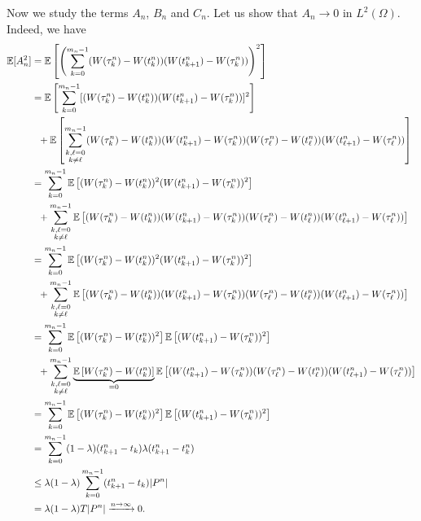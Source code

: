 \begin{solution}
  Now we study the terms $A_n$, $B_n$ and $C_n$. Let us show that $A_n\to 0$ in $L^2(\Omega)$. Indeed, we have
  \begin{align*}
    \mathbb{E}[A_n^2]
     & = \mathbb{E}\left[\left(\sum\limits_{k=0}^{m_n-1}(W(\tau_k^n) - W(t_k^n))(W(t^n_{k+1}) - W(\tau_k^n))\right)^2\right]        \\
     & = \mathbb{E}\left[\sum\limits_{k=0}^{m_n-1}[(W(\tau_k^n) - W(t_k^n))(W(t^n_{k+1}) - W(\tau_k^n))]^2\right]                   \\
     & \,\,\,\, + \mathbb{E}\left[\sum\limits_{\substack{k,\ell=0                                                                   \\ k\ne \ell}}^{m_n-1}(W(\tau_k^n) - W(t_k^n))(W(t^n_{k+1}) - W(\tau_k^n))(W(\tau_\ell^n) - W(t_\ell^n))(W(t^n_{\ell+1}) - W(\tau_\ell^n))\right]\\
     & = \sum\limits_{k=0}^{m_n-1}\mathbb{E}\left[(W(\tau_k^n) - W(t_k^n))^2(W(t^n_{k+1}) - W(\tau_k^n))^2\right]                   \\
     & \,\,\,\, + \sum\limits_{\substack{k,\ell=0                                                                            \\ k\ne \ell}}^{m_n-1}\mathbb{E}\left[(W(\tau_k^n) - W(t_k^n))(W(t^n_{k+1}) - W(\tau_k^n))(W(\tau_\ell^n) - W(t_\ell^n))(W(t^n_{\ell+1}) - W(\tau_\ell^n))\right]\\
     & = \sum\limits_{k=0}^{m_n-1}\mathbb{E}\left[(W(\tau_k^n) - W(t_k^n))^2(W(t^n_{k+1}) - W(\tau_k^n))^2\right]                   \\
     & \,\,\,\, + \sum\limits_{\substack{k,\ell=0                                                                            \\ k\ne \ell}}^{m_n-1}\mathbb{E}\left[(W(\tau_k^n) - W(t_k^n))(W(t^n_{k+1}) - W(\tau_k^n))(W(\tau_\ell^n) - W(t_\ell^n))(W(t^n_{\ell+1}) - W(\tau_\ell^n))\right]\\
     & = \sum\limits_{k=0}^{m_n-1}\mathbb{E}\left[(W(\tau_k^n) - W(t_k^n))^2\right]  \mathbb{E}\left[(W(t^n_{k+1}) - W(\tau_k^n))^2\right] \\
     & \,\,\,\, + \sum\limits_{\substack{k,\ell=0                                                                            \\ k\ne \ell}}^{m_n-1}\underbrace{\mathbb{E}\left[W(\tau_k^n) - W(t_k^n)\right]}_{=0}\mathbb{E}\left[(W(t^n_{k+1}) - W(\tau_k^n))(W(\tau_\ell^n) - W(t_\ell^n))(W(t^n_{\ell+1}) - W(\tau_\ell^n))\right]\\
     & = \sum\limits_{k=0}^{m_n-1}\mathbb{E}\left[(W(\tau_k^n) - W(t_k^n))^2\right]  \mathbb{E}\left[(W(t^n_{k+1}) - W(\tau_k^n))^2\right] \\
     & = \sum\limits_{k=0}^{m_n-1}(1-\lambda)(t_{k+1}^n - t_k)\lambda(t_{k+1}^n - t_k^n)                                     \\
     & \le \lambda(1-\lambda) \sum\limits_{k=0}^{m_n-1}(t_{k+1}^n - t_k)|P^n|                                                \\
     & = \lambda(1-\lambda)T|P^n| \xrightarrow{n\to\infty} 0.
  \end{align*}


\end{solution}
